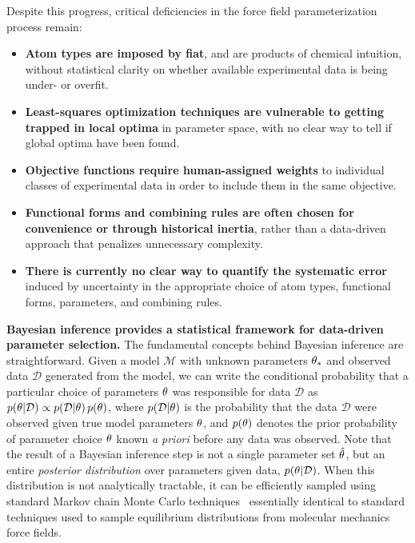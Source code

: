 \documentclass[aps,pre,twocolumn,nofootinbib,superscriptaddress,linenumbers]{revtex4-1}
\begin{document}
Despite this progress, critical deficiencies in the force field parameterization process remain:
\begin{itemize}
\item {\bf Atom types are imposed by fiat}, and are products of chemical intuition, without statistical clarity on whether available experimental data is being under- or overfit.
\item {\bf Least-squares optimization techniques are vulnerable to getting trapped in local optima} in parameter space, with no clear way to tell if global optima have been found.
\item {\bf Objective functions require human-assigned weights} to individual classes of experimental data in order to include them in the same objective.~\citep{paliwal_phd}
\item {\bf Functional forms and combining rules are often chosen for convenience or through historical inertia}, rather than a data-driven approach that penalizes unnecessary complexity.
\item {\bf There is currently no clear way to quantify the systematic error} induced by uncertainty in the appropriate choice of atom types, functional forms, parameters, and combining rules.  
\end{itemize}

{\bf Bayesian inference provides a statistical framework for data-driven parameter selection.}
The fundamental concepts behind Bayesian inference are straightforward.
Given a model $\mathcal{M}$ with unknown parameters ${\bf \theta}_*$ and observed data $\mathcal{D}$ generated from the model, we can write the conditional probability that a particular choice of parameters ${\bf \theta}$ was responsible for data $\mathcal{D}$ as
$p({\bf \theta} | \mathcal{D}) \propto p(\mathcal{D} | {\bf \theta}) \, p({\bf \theta})$,
where $p(\mathcal{D} | {\bf \theta})$ is the probability that the data $\mathcal{D}$ were observed given true model parameters ${\bf \theta}$, and $p({\bf \theta})$ denotes the prior probability of parameter choice ${\bf \theta}$ known \emph{a priori} before any data was observed.
Note that the result of a Bayesian inference step is not a single parameter set $\hat{\bf \theta}$, but an entire \emph{posterior distribution} over parameters given data, $p({\bf \theta} | \mathcal{D})$.
When this distribution is not analytically tractable, it can be efficiently sampled using standard Markov chain Monte Carlo techniques~\cite{jun-s-liu:mcmc} essentially identical to standard techniques used to sample equilibrium distributions from molecular mechanics force fields.
\end{document}
